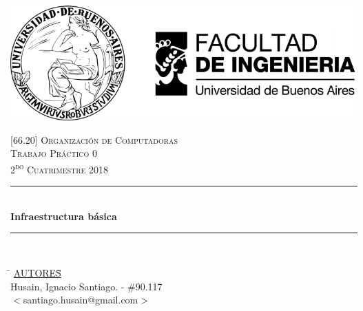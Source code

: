 

\pagestyle{fancy}
\begin{titlepage}
	\newcommand{\HRule}{\rule{\linewidth}{0.5mm}} %
	\center %
	
	\thispagestyle{empty}
	\begin{center}
		\includegraphics[scale=1]{includes/banner_fiuba.pdf}\\
	\end{center}
	
	
	\textsc{\LARGE \textsc{[66.20] Organización de Computadoras}}\\[0.5cm]
	\textsc{\Large \textsc{Trabajo Práctico 0}}\\[0.5cm]
	\textsc{\large 2\textsuperscript{do} Cuatrimestre 2018}\\[0.25cm]
	
	\HRule\\[0.5cm]
	{\huge\bfseries Infraestructura básica}\\[0.2cm]
	\HRule\\[0.5cm]
	
	\begin{tabbing}
		\hspace{2cm}\=\+
		\underline{AUTORES}\hspace{-1cm}\=\+\hspace{1cm}\=\hspace{6cm}\=\\[0.2cm]
		
		Husain, Ignacio Santiago.	\>\>- \#90.117\\
		\>\footnotesize{$<$santiago.husain@gmail.com$>$}\\
		

\end{tabbing}
\end{titlepage}
